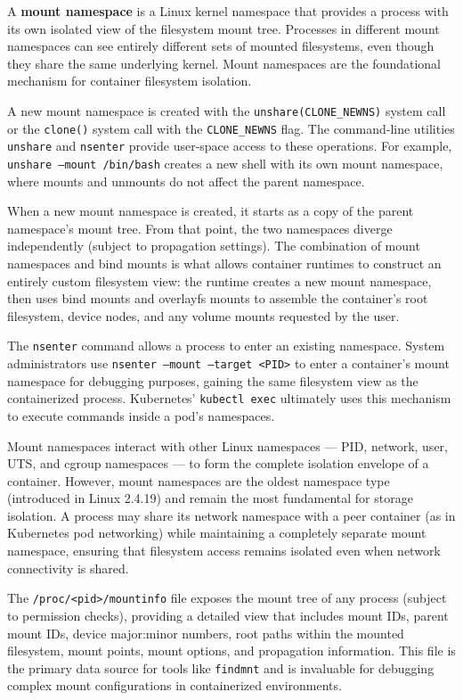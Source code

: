 A \textbf{mount namespace} is a Linux kernel namespace that provides a process with its own isolated view of the filesystem mount tree. Processes in different mount namespaces can see entirely different sets of mounted filesystems, even though they share the same underlying kernel. Mount namespaces are the foundational mechanism for container filesystem isolation.

A new mount namespace is created with the \texttt{unshare(CLONE\_NEWNS)} system call or the \texttt{clone()} system call with the \texttt{CLONE\_NEWNS} flag. The command-line utilities \texttt{unshare} and \texttt{nsenter} provide user-space access to these operations. For example, \texttt{unshare --mount /bin/bash} creates a new shell with its own mount namespace, where mounts and unmounts do not affect the parent namespace.

When a new mount namespace is created, it starts as a copy of the parent namespace's mount tree. From that point, the two namespaces diverge independently (subject to propagation settings). The combination of mount namespaces and bind mounts is what allows container runtimes to construct an entirely custom filesystem view: the runtime creates a new mount namespace, then uses bind mounts and overlayfs mounts to assemble the container's root filesystem, device nodes, and any volume mounts requested by the user.

The \texttt{nsenter} command allows a process to enter an existing namespace. System administrators use \texttt{nsenter --mount --target <PID>} to enter a container's mount namespace for debugging purposes, gaining the same filesystem view as the containerized process. Kubernetes' \texttt{kubectl exec} ultimately uses this mechanism to execute commands inside a pod's namespaces.

Mount namespaces interact with other Linux namespaces --- PID, network, user, UTS, and cgroup namespaces --- to form the complete isolation envelope of a container. However, mount namespaces are the oldest namespace type (introduced in Linux 2.4.19) and remain the most fundamental for storage isolation. A process may share its network namespace with a peer container (as in Kubernetes pod networking) while maintaining a completely separate mount namespace, ensuring that filesystem access remains isolated even when network connectivity is shared.

The \texttt{/proc/<pid>/mountinfo} file exposes the mount tree of any process (subject to permission checks), providing a detailed view that includes mount IDs, parent mount IDs, device major:minor numbers, root paths within the mounted filesystem, mount points, mount options, and propagation information. This file is the primary data source for tools like \texttt{findmnt} and is invaluable for debugging complex mount configurations in containerized environments.

